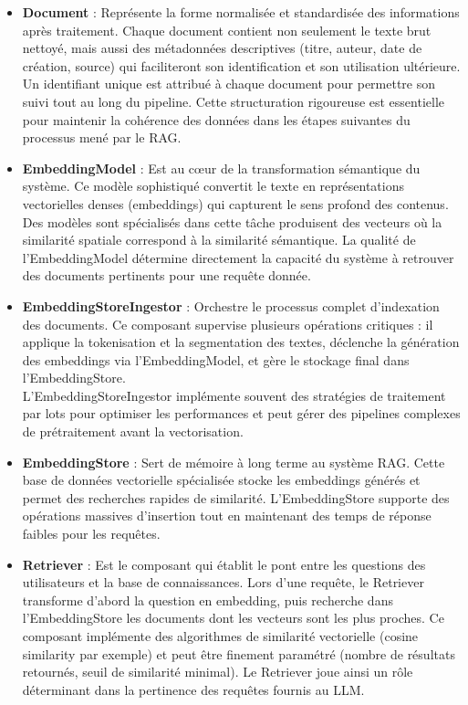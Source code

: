 \documentclass[12pt,a4paper]{report}
\begin{document}
\begin{itemize}
		\item \textbf{Document} : Représente la forme normalisée et standardisée des informations après traitement. Chaque document contient non seulement le texte brut nettoyé, mais aussi des métadonnées descriptives (titre, auteur, date de création, source) qui faciliteront son identification et son utilisation ultérieure. Un identifiant unique est attribué à chaque document pour permettre son suivi tout au long du pipeline. Cette structuration rigoureuse est essentielle pour maintenir la cohérence des données dans les étapes suivantes du processus mené par le RAG.
		
		\item \textbf{EmbeddingModel} : Est au cœur de la transformation sémantique du système. Ce modèle sophistiqué convertit le texte en représentations vectorielles denses (embeddings) qui capturent le sens profond des contenus. Des modèles sont spécialisés dans cette tâche produisent des vecteurs où la similarité spatiale correspond à la similarité sémantique. La qualité de l'EmbeddingModel détermine directement la capacité du système à retrouver des documents pertinents pour une requête donnée.
		
		\item \textbf{EmbeddingStoreIngestor} : Orchestre le processus complet d'indexation des documents. Ce composant supervise plusieurs opérations critiques : il applique la tokenisation et la segmentation des textes, déclenche la génération des embeddings via l'EmbeddingModel, et gère le stockage final dans l'EmbeddingStore. \\ L'EmbeddingStoreIngestor implémente souvent des stratégies de traitement par lots pour optimiser les performances et peut gérer des pipelines complexes de prétraitement avant la vectorisation.
		
		\item \textbf{EmbeddingStore} : Sert de mémoire à long terme au système RAG. Cette base de données vectorielle spécialisée stocke les embeddings générés et permet des recherches rapides de similarité. L'EmbeddingStore supporte des opérations massives d'insertion tout en maintenant des temps de réponse faibles pour les requêtes.
		
		\item \textbf{Retriever} : Est le composant qui établit le pont entre les questions des utilisateurs et la base de connaissances. Lors d'une requête, le Retriever transforme d'abord la question en embedding, puis recherche dans l'EmbeddingStore les documents dont les vecteurs sont les plus proches. Ce composant implémente des algorithmes de similarité vectorielle (cosine similarity par exemple) et peut être finement paramétré (nombre de résultats retournés, seuil de similarité minimal). Le Retriever joue ainsi un rôle déterminant dans la pertinence des requêtes fournis au LLM.
		
	\end{itemize}
	
\end{document}
